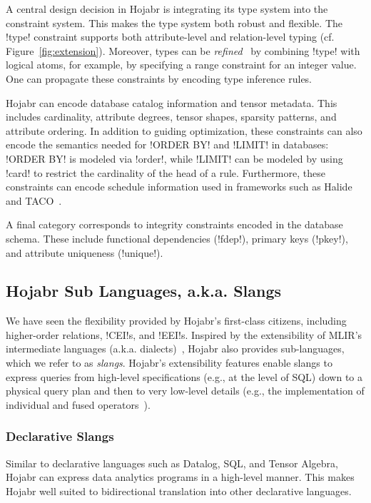 \documentclass[sigconf,nonacm]{acmart}
\begin{document}
 A central design decision in Hojabr is integrating its type system into the constraint system. This makes the type system both robust and flexible. The !type! constraint supports both attribute-level and relation-level typing (cf. Figure~\ref{fig:extension}). Moreover, types can be \textit{refined}~\cite{freeman1991refinement} by combining !type! with logical atoms, for example, by specifying a range constraint for an integer value. One can propagate these constraints by encoding type inference rules.

 Hojabr can encode database catalog information and tensor metadata. This includes cardinality, attribute degrees, tensor shapes, sparsity patterns, and attribute ordering. In addition to guiding optimization, these constraints can also encode the semantics needed for !ORDER BY! and !LIMIT! in databases: !ORDER BY! is modeled via !order!, while !LIMIT! can be modeled by using !card! to restrict the cardinality of the head of a rule. Furthermore, these constraints can encode schedule information used in frameworks such as Halide~\cite{ragan2013halide} and TACO~\cite{kjolstad2017tensor}.

 A final category corresponds to integrity constraints encoded in the database schema. These include functional dependencies (!fdep!), primary keys (!pkey!), and attribute uniqueness (!unique!).



\subsection{Hojabr Sub Languages, a.k.a. Slangs}
We have seen the flexibility provided by Hojabr’s first-class citizens, including higher-order relations, !CEI!s, and !EEI!s. Inspired by the extensibility of MLIR’s intermediate languages (a.k.a. dialects)~\cite{lattner2021mlir}, Hojabr also provides sub-languages, which we refer to as \textit{slangs}. Hojabr’s extensibility features enable slangs to express queries from high-level specifications (e.g., at the level of SQL) down to a physical query plan and then to very low-level details (e.g., the implementation of individual and fused operators~\cite{shaikhha2018push,menon2017relaxed}).

\subsubsection{Declarative Slangs} Similar to declarative languages such as Datalog, SQL, and Tensor Algebra, Hojabr can express data analytics programs in a high-level manner. This makes Hojabr well suited to bidirectional translation into other declarative languages.
\end{document}
